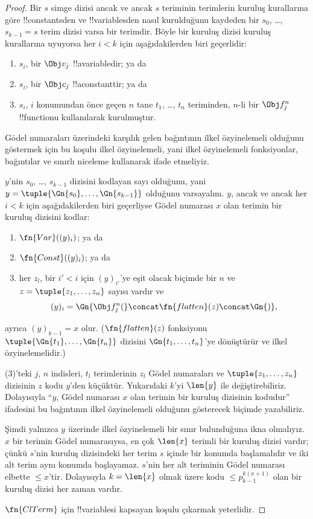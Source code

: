 \documentclass[../../../include/open-logic-section]{subfiles}
\begin{document}
\begin{proof}
Bir $s$ simge dizisi ancak ve ancak $s$ teriminin terimlerin kuruluş
kurallarına göre !!{constant}s{}den ve !!{variable}s{}den nasıl kurulduğunu
kaydeden bir $s_0$, \dots, $s_{k-1}=s$ terim dizisi varsa bir terimdir.
Böyle bir kuruluş dizisi kuruluş kurallarına uyuyorsa her $i<k$ için
aşağıdakilerden biri geçerlidir:
\begin{enumerate}
\item $s_i$, bir $\Obj v_j$ !!a{variable}{}dir; ya da
\item $s_i$, bir $\Obj c_j$ !!a{constant}{}tir; ya da
\item $s_i$, $i$ konumundan önce geçen $n$ tane $t_1$, \dots, $t_n$
  teriminden, $n$-li bir $\Obj f^n_j$ !!{function}{}u kullanılarak kurulmuştur.
\end{enumerate}
Gödel numaraları üzerindeki karşılık gelen bağıntının ilkel özyinelemeli
olduğunu göstermek için bu koşulu ilkel özyinelemeli, yani ilkel özyinelemeli
fonksiyonlar, bağıntılar ve sınırlı niceleme kullanarak ifade etmeliyiz.

$y$'nin $s_0$, \dots, $s_{k-1}$ dizisini kodlayan sayı olduğunu, yani
$y=\tuple{\Gn{s_0},\dots,\Gn{s_{k-1}}}$ olduğunu varsayalım. $y$, ancak ve
ancak her $i<k$ için aşağıdakilerden biri geçerliyse Gödel numarası $x$ olan
terimin bir kuruluş dizisini kodlar:
\begin{enumerate}
\item $\fn{Var}((y)_i)$; ya da
\item $\fn{Const}((y)_i)$; ya da
\item her $z_l$, bir $i'<i$ için $(y)_{i'}$'ye eşit olacak biçimde bir $n$
  ve $z=\tuple{z_1,\dots,z_n}$ sayısı vardır ve
\[
(y)_i = \Gn{\Obj f^n_j(} \concat \fn{flatten}(z) \concat \Gn{)},
\]
\end{enumerate}
ayrıca $(y)_{k-1}=x$ olur. ($\fn{flatten}(z)$ fonksiyonu
$\tuple{\Gn{t_1},\dots,\Gn{t_n}}$ dizisini $\Gn{t_1,\dots,t_n}$'ye
dönüştürür ve ilkel özyinelemelidir.)

(3)'teki $j$, $n$ indisleri, $t_l$ terimlerinin $z_l$ Gödel numaraları ve
$\tuple{z_1,\dots,z_n}$ dizisinin $z$ kodu $y$'den küçüktür. Yukarıdaki
$k$'yi $\len{y}$ ile değiştirebiliriz. Dolayısıyla ``$y$, Gödel numarası $x$
olan terimin bir kuruluş dizisinin kodudur'' ifadesini bu bağıntının ilkel
özyinelemeli olduğunu gösterecek biçimde yazabiliriz.

Şimdi yalnızca $y$ üzerinde ilkel özyinelemeli bir sınır bulunduğuna ikna
olmalıyız. $x$ bir terimin Gödel numarasıysa, en çok $\len{x}$ terimli bir
kuruluş dizisi vardır; çünkü $s$'nin kuruluş dizisindeki her terim $s$
içinde bir konumda başlamalıdır ve iki alt terim aynı konumda başlayamaz.
$s$'nin her alt teriminin Gödel numarası elbette $\le x$'tir. Dolayısıyla
$k=\len{x}$ olmak üzere kodu $\le p_{k-1}^{k(x+1)}$ olan bir kuruluş dizisi
her zaman vardır.

$\fn{ClTerm}$ için !!{variable}s{}i kapsayan koşulu çıkarmak yeterlidir.
\end{proof}
\end{document}
